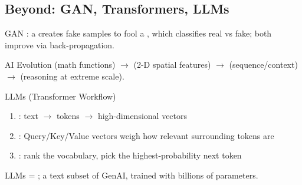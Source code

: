 \subsection{Beyond: GAN, Transformers, LLMs}


\begin{definition}{GAN}
    : a  creates fake
    samples to fool a , which classifies real vs fake; both
    improve via back-propagation.
\end{definition}

\begin{definition}{AI Evolution}
     (math functions) $\to$  (2-D spatial features) $\to$
     (sequence/context) $\to$  (reasoning at
    extreme scale).
\end{definition}

\multend

\begin{definition}{LLMs (Transformer Workflow)}
    \begin{enumerate}
        \item {}: text $\to$ tokens $\to$
              high-dimensional vectors
        \item {}: Query/Key/Value vectors weigh how
              relevant surrounding tokens are
        \item {}: rank the vocabulary, pick the
              highest-probability next token
    \end{enumerate}
    LLMs = ; a text subset of GenAI, trained with
    billions of parameters.
\end{definition}

\raggedcolumns
